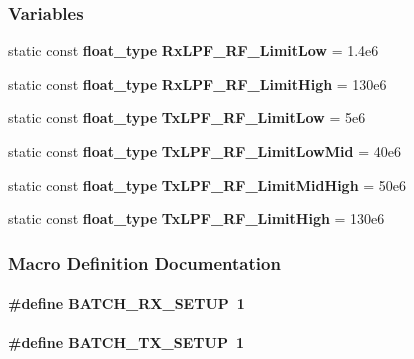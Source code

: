 \subsubsection*{Variables}
\begin{DoxyCompactItemize}
\item 
static const {\bf float\+\_\+type} {\bf Rx\+L\+P\+F\+\_\+\+R\+F\+\_\+\+Limit\+Low} = 1.\+4e6
\item 
static const {\bf float\+\_\+type} {\bf Rx\+L\+P\+F\+\_\+\+R\+F\+\_\+\+Limit\+High} = 130e6
\item 
static const {\bf float\+\_\+type} {\bf Tx\+L\+P\+F\+\_\+\+R\+F\+\_\+\+Limit\+Low} = 5e6
\item 
static const {\bf float\+\_\+type} {\bf Tx\+L\+P\+F\+\_\+\+R\+F\+\_\+\+Limit\+Low\+Mid} = 40e6
\item 
static const {\bf float\+\_\+type} {\bf Tx\+L\+P\+F\+\_\+\+R\+F\+\_\+\+Limit\+Mid\+High} = 50e6
\item 
static const {\bf float\+\_\+type} {\bf Tx\+L\+P\+F\+\_\+\+R\+F\+\_\+\+Limit\+High} = 130e6
\end{DoxyCompactItemize}


\subsubsection{Macro Definition Documentation}
\paragraph[{B\+A\+T\+C\+H\+\_\+\+R\+X\+\_\+\+S\+E\+T\+UP}]{\setlength{\rightskip}{0pt plus 5cm}\#define B\+A\+T\+C\+H\+\_\+\+R\+X\+\_\+\+S\+E\+T\+UP~1}\label{lms7002m__filters_8c_a3effd48ce344144155ae040e316ee0cf}
\paragraph[{B\+A\+T\+C\+H\+\_\+\+T\+X\+\_\+\+S\+E\+T\+UP}]{\setlength{\rightskip}{0pt plus 5cm}\#define B\+A\+T\+C\+H\+\_\+\+T\+X\+\_\+\+S\+E\+T\+UP~1}\label{lms7002m__filters_8c_a9d0cfc738b7b42e6b902cbf22037b102}


